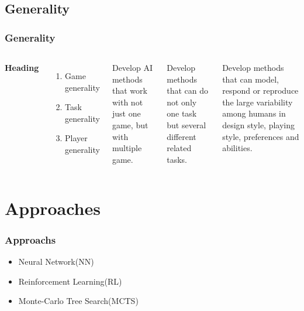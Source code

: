 \documentclass{beamer}
\begin{document}
\subsection{Generality}
\begin{frame}
\frametitle{Generality\cite{4}}
\begin{columns}[c] %

\textbf{Heading}
\begin{enumerate}
\item Game generality
\item Task generality
\item Player generality 
\end{enumerate}


Develop AI methods that work with not just one game, but with multiple game.

Develop methods that can do not only one task but several different related tasks.

Develop methods that can model, respond or reproduce the large variability among humans in design style, playing style, preferences and abilities.
\end{columns}
\end{frame}

\section{Approaches}
\begin{frame}
  \frametitle{Approachs}
  \begin{itemize}
    \item Neural Network(NN)
    \item Reinforcement Learning(RL)
    \item Monte-Carlo Tree Search(MCTS)
  \end{itemize}
\end{frame}
\end{document}
